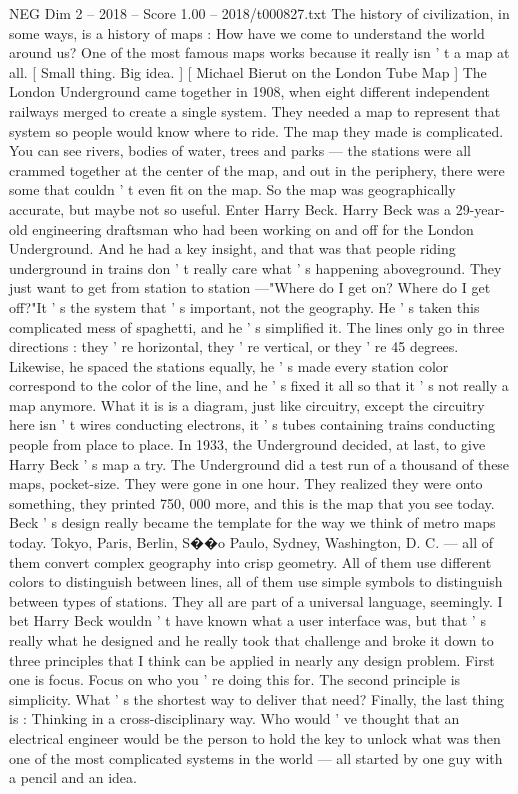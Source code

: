 \begin{textsample}{NEG Dim 2 – 2018 – Score 1.00 – 2018/t000827.txt}  \label{ex:f2_neg_045}
The history of civilization, in some ways, is a history of maps : How have we come to understand the world around us?
One of the most famous maps works because it really isn ' t a map at all. [ Small thing.
Big idea. ] [ Michael Bierut on the London Tube Map ] The London Underground came together in 1908, when eight different independent railways merged to create a single system.
They needed a map to represent that system so people would know where to ride.
The map they made is complicated.
You can see rivers, bodies of water, trees and parks — the stations were all crammed together at the center of the map, and out in the periphery, there were some that couldn ' t even fit on the map.
So the map was geographically accurate, but maybe not so useful.
Enter Harry Beck.
Harry Beck was a 29-year-old engineering draftsman who had been working on and off for the London Underground.
And he had a key insight, and that was that people riding underground in trains don ' t really care what ' s happening aboveground.
They just want to get from station to station —"Where do I get on?
Where do I get off?"It ' s the system that ' s important, not the geography.
He ' s taken this complicated mess of spaghetti, and he ' s simplified it.
The lines only go in three directions : they ' re horizontal, they ' re vertical, or they ' re 45 degrees.
Likewise, he spaced the stations equally, he ' s made every station color correspond to the color of the line, and he ' s fixed it all so that it ' s not really a map anymore.
What it is is a diagram, just like circuitry, except the circuitry here isn ' t wires conducting electrons, it ' s tubes containing trains conducting people from place to place.
In 1933, the Underground decided, at last, to give Harry Beck ' s map a try.
The Underground did a test run of a thousand of these maps, pocket-size.
They were gone in one hour.
They realized they were onto something, they printed 750, 000 more, and this is the map that you see today.
Beck ' s design really became the template for the way we think of metro maps today.
Tokyo, Paris, Berlin, S{\EmojiFont �}{\EmojiFont �}o Paulo, Sydney, Washington, D.
C. — all of them convert complex geography into crisp geometry.
All of them use different colors to distinguish between lines, all of them use simple symbols to distinguish between types of stations.
They all are part of a universal language, seemingly.
I bet Harry Beck wouldn ' t have known what a user interface was, but that ' s really what he designed and he really took that challenge and broke it down to three principles that I think can be applied in nearly any design problem.
First one is focus.
Focus on who you ' re doing this for.
The second principle is simplicity.
What ' s the shortest way to deliver that need?
Finally, the last thing is : Thinking in a cross-disciplinary way.
Who would ' ve thought that an electrical engineer would be the person to hold the key to unlock what was then one of the most complicated systems in the world — all started by one guy with a pencil and an idea.

\end{textsample}

